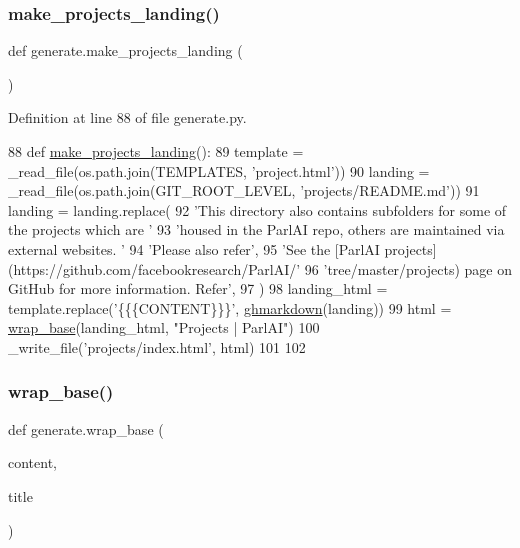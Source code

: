 \subsubsection{\texorpdfstring{make\+\_\+projects\+\_\+landing()}{make\_projects\_landing()}}
{\footnotesize\ttfamily def generate.\+make\+\_\+projects\+\_\+landing (\begin{DoxyParamCaption}{ }\end{DoxyParamCaption})}



Definition at line 88 of file generate.\+py.


\begin{DoxyCode}
88 \textcolor{keyword}{def }\hyperlink{namespacegenerate_a33f954414406a12534e313700841053e}{make\_projects\_landing}():
89     template = \_read\_file(os.path.join(TEMPLATES, \textcolor{stringliteral}{'project.html'}))
90     landing = \_read\_file(os.path.join(GIT\_ROOT\_LEVEL, \textcolor{stringliteral}{'projects/README.md'}))
91     landing = landing.replace(
92         \textcolor{stringliteral}{'This directory also contains subfolders for some of the projects which are '}
93         \textcolor{stringliteral}{'housed in the ParlAI repo, others are maintained via external websites. '}
94         \textcolor{stringliteral}{'Please also refer'},
95         \textcolor{stringliteral}{'See the [ParlAI projects](https://github.com/facebookresearch/ParlAI/'}
96         \textcolor{stringliteral}{'tree/master/projects) page on GitHub for more information. Refer'},
97     )
98     landing\_html = template.replace(\textcolor{stringliteral}{'\{\{\{CONTENT\}\}\}'}, \hyperlink{namespacegenerate_a7811fd26fa2e3aeec0e3d3851cdda546}{ghmarkdown}(landing))
99     html = \hyperlink{namespacegenerate_adb990cdb948e21150b35af85d236b6be}{wrap\_base}(landing\_html, \textcolor{stringliteral}{"Projects | ParlAI"})
100     \_write\_file(\textcolor{stringliteral}{'projects/index.html'}, html)
101 
102 
\end{DoxyCode}
\mbox{\label{namespacegenerate_adb990cdb948e21150b35af85d236b6be}} 
\subsubsection{\texorpdfstring{wrap\+\_\+base()}{wrap\_base()}}
{\footnotesize\ttfamily def generate.\+wrap\+\_\+base (\begin{DoxyParamCaption}\item[{}]{content,  }\item[{}]{title }\end{DoxyParamCaption})}



